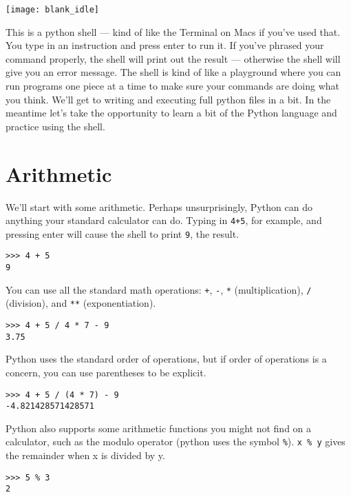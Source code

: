 \begin{center}
	\texttt{[image: blank\_idle]}
\end{center}

This is a python shell --- kind of like the Terminal on Macs if you’ve used that. You type in an instruction and press enter to run it. If you’ve phrased your command properly, the shell will print out the result --- otherwise the shell will give you an error message. The shell is kind of like a playground where you can run programs one piece at a time to make sure your commands are doing what you think. We’ll get to writing and executing full python files in a bit. In the meantime let’s take the opportunity to learn a bit of the Python language and practice using the shell.


\section*{Arithmetic}

We’ll start with some arithmetic. Perhaps unsurprisingly, Python can do anything your standard calculator can do. Typing in \texttt{4+5}, for example, and pressing enter will cause the shell to print \texttt{9}, the result.

\begin{lstlisting}[numbers=none]
>>> 4 + 5 
9
\end{lstlisting}

You can use all the standard math operations: \texttt{+}, \texttt{-}, \texttt{*} (multiplication), \texttt{/} (division), and \texttt{**} (exponentiation).

\begin{lstlisting}[numbers=none]
>>> 4 + 5 / 4 * 7 - 9
3.75
\end{lstlisting}

Python uses the standard order of operations, but if order of operations is a concern, you can use parentheses to be explicit.

\begin{lstlisting}[numbers=none]
>>> 4 + 5 / (4 * 7) - 9
-4.821428571428571
\end{lstlisting}

Python also supports some arithmetic functions you might not find on a calculator, such as the modulo operator (python uses the symbol \texttt{\%}). \texttt{x \% y} gives the remainder when x is divided by y. 

\begin{lstlisting}[numbers=none]
>>> 5 % 3
2
\end{lstlisting}

